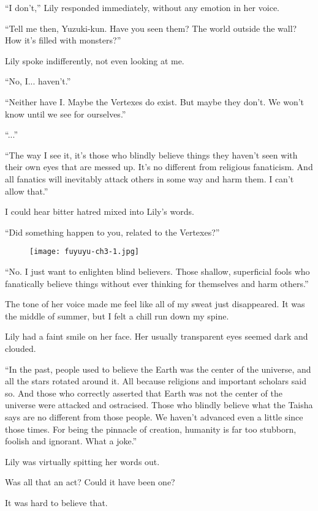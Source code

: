 ``I don't,'' Lily responded immediately, without any emotion in her voice.

``Tell me then, Yuzuki-kun. Have you seen them? The world outside the wall? How it's filled with monsters?''

Lily spoke indifferently, not even looking at me.

``No, I... haven't.''

``Neither have I. Maybe the Vertexes do exist. But maybe they don't. We won't know until we see for ourselves.''

``...''

``The way I see it, it's those who blindly believe things they haven't seen with their own eyes that are messed up. It's no different from religious fanaticism. And all fanatics will inevitably attack others in some way and harm them. I can't allow that.''

I could hear bitter hatred mixed into Lily's words.

``Did something happen to you, related to the Vertexes?''

\begin{figure}[p]
\texttt{[image: fuyuyu-ch3-1.jpg]}
\end{figure}

``No. I just want to enlighten blind believers. Those shallow, superficial fools who fanatically believe things without ever thinking for themselves and harm others.''

The tone of her voice made me feel like all of my sweat just disappeared. It was the middle of summer, but I felt a chill run down my spine.

Lily had a faint smile on her face. Her usually transparent eyes seemed dark and clouded.

``In the past, people used to believe the Earth was the center of the universe, and all the stars rotated around it. All because religions and important scholars said so. And those who correctly asserted that Earth was not the center of the universe were attacked and ostracised. Those who blindly believe what the Taisha says are no different from those people. We haven't advanced even a little since those times. For being the pinnacle of creation, humanity is far too stubborn, foolish and ignorant. What a joke.''

Lily was virtually spitting her words out.

Was all that an act? Could it have been one?

It was hard to believe that.

